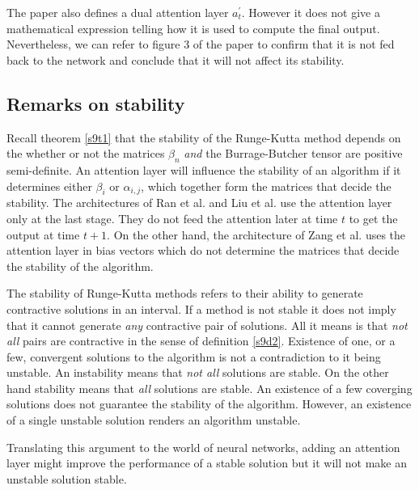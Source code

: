\documentclass{article}
\numberwithin{equation}{section}
\begin{document}
The paper also defines a dual attention layer $a_t^\prime$. However it
does not give a mathematical expression telling how it is used to compute
the final output. Nevertheless, we can refer to figure 3 of the paper
\cite{liu2018table} to confirm that it is not fed back to the network 
and conclude that it will not affect its stability.

\subsection{Remarks on stability}
Recall theorem \ref{s9t1} that the stability of the Runge-Kutta method 
depends on the whether or not the matrices $\beta_n$ \emph{and} the 
Burrage-Butcher tensor are positive semi-definite. An attention layer will
influence the stability of an algorithm if it determines either $\beta_i$
or $\alpha_{i,j}$, which together form the matrices that decide the
stability. The architectures of Ran et al. and Liu et al. use the 
attention layer only at the last stage. They do not feed the attention
later at time $t$ to get the output at time $t + 1$. On the other hand, 
the architecture of Zang et al. uses the attention layer in bias vectors
which do not determine the matrices that decide the stability of the
algorithm.

The stability of Runge-Kutta methods refers to their ability to generate
contractive solutions in an interval. If a method is not stable it does not
imply that it cannot generate \emph{any} contractive pair of solutions. All
it means is that \emph{not all} pairs are contractive in the sense of 
definition \ref{s9d2}. Existence of one, or a few, convergent solutions to 
the algorithm is not a contradiction to it being unstable. An instability 
means that \emph{not all} solutions are stable. On the other hand stability 
means that \emph{all} solutions are stable. An existence of a few coverging 
solutions does not guarantee the stability of the algorithm. However, an 
existence of a single unstable solution renders an algorithm unstable.

Translating this argument to the world of neural networks, adding an 
attention layer might improve the performance of a stable solution but it
will not make an unstable solution stable.
\end{document}
